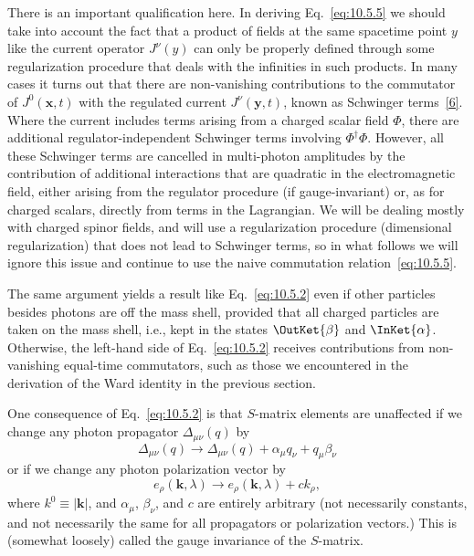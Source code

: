 There is an important qualification here. In deriving Eq.~\eqref{eq:10.5.5}
we should take into account the fact that a product of fields at the same
spacetime point $y$ like the current operator $J^\nu(y)$ can only be properly
defined through some regularization procedure that deals with the infinities
in such products. In many cases it turns out that there are non-vanishing
contributions to the commutator of $J^0(\mathbf{x},t)$ with the regulated
current $J^\nu(\mathbf{y},t)$, known as Schwinger terms~\hyperref[ref:10.6]{[6]}.
Where the current includes terms arising from a charged scalar field $\Phi$,
there are additional regulator-independent Schwinger terms involving
$\Phi^\dagger\Phi$. However, all these Schwinger terms are cancelled in
multi-photon amplitudes by the contribution of additional interactions that
are quadratic in the electromagnetic field, either arising from the regulator
procedure (if gauge-invariant) or, as for charged scalars, directly from terms
in the Lagrangian. We will be dealing mostly with charged spinor fields, and
will use a regularization procedure (dimensional regularization) that does not
lead to Schwinger terms, so in what follows we will ignore this issue and
continue to use the naive commutation relation~\eqref{eq:10.5.5}.

The same argument yields a result like Eq.~\eqref{eq:10.5.2} even if other
particles besides photons are off the mass shell, provided that all charged
particles are taken on the mass shell, i.e., kept in the states
$\OutKet{\beta}$ and $\InKet{\alpha}$. Otherwise, the
left-hand side of Eq.~\eqref{eq:10.5.2} receives contributions from
non-vanishing equal-time commutators, such as those we encountered in the
derivation of the Ward identity in the previous section.

One consequence of Eq.~\eqref{eq:10.5.2} is that $S$-matrix elements are
unaffected if we change any photon propagator $\Delta_{\mu\nu}(q)$ by
\begin{equation}
  \Delta_{\mu\nu}(q)\longrightarrow
  \Delta_{\mu\nu}(q)+\alpha_\mu q_\nu+q_\mu\beta_\nu
  \tag{10.5.7}\label{eq:10.5.7}
\end{equation}
or if we change any photon polarization vector by
\begin{equation}
  e_\rho(\mathbf{k},\lambda)\longrightarrow
  e_\rho(\mathbf{k},\lambda)+ck_\rho,
  \tag{10.5.8}\label{eq:10.5.8}
\end{equation}
where $k^0\equiv|\mathbf{k}|$, and $\alpha_\mu$, $\beta_\nu$, and $c$ are
entirely arbitrary (not necessarily constants, and not necessarily the same
for all propagators or polarization vectors.) This is (somewhat loosely)
called the gauge invariance of the $S$-matrix.

